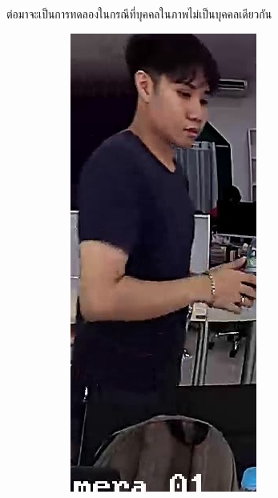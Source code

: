 \clearpage
ต่อมาจะเป็นการทดลองในกรณีที่บุคคลในภาพไม่เป็นบุคคลเดียวกัน
\begin{figure}[!ht]
    \centering
    \begin{subfigure}[b]{0.1\textwidth}
        \centering
        \includegraphics[width=\textwidth]{chapter4/images/first_3.jpg}

\end{subfigure}
\end{figure}
